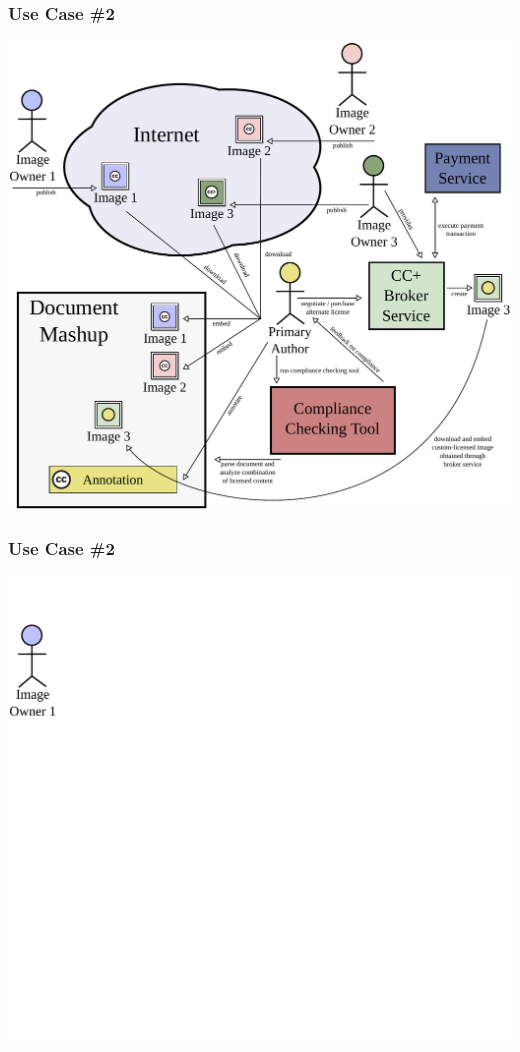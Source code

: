 \documentclass[mathserif,xcolor=dvipsnames,hyperref={bookmarks=true}]{beamer}
\begin{document}
    \begin{frame}[t]
        \frametitle{Use Case \#2}
        \begin{center}
            \includegraphics[width=0.9\textheight]{../resources/usecases/usecase2/usecase2-step40.pdf}
        \end{center}
    \end{frame}
    \begin{frame}[t]
        \frametitle{Use Case \#2}
        \begin{center}
            \includegraphics[width=0.9\textheight]{../resources/usecases/usecase2/usecase2-step01.pdf}
        \end{center}
    \end{frame}
\end{document}
